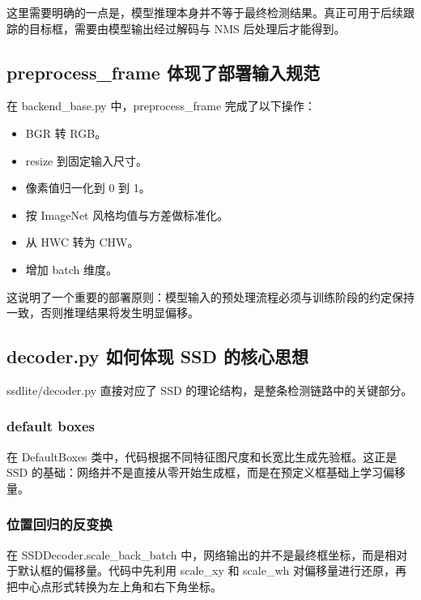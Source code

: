 这里需要明确的一点是，模型推理本身并不等于最终检测结果。真正可用于后续跟踪的目标框，需要由模型输出经过解码与
NMS 后处理后才能得到。

\subsection{preprocess\_frame
体现了部署输入规范}\label{src-experiment-case2-h27}

在 backend\_base.py 中，preprocess\_frame 完成了以下操作：

\begin{itemize}
\tightlist
\item
  BGR 转 RGB。
\item
  resize 到固定输入尺寸。
\item
  像素值归一化到 0 到 1。
\item
  按 ImageNet 风格均值与方差做标准化。
\item
  从 HWC 转为 CHW。
\item
  增加 batch 维度。
\end{itemize}

这说明了一个重要的部署原则：模型输入的预处理流程必须与训练阶段的约定保持一致，否则推理结果将发生明显偏移。

\subsection{decoder.py 如何体现 SSD
的核心思想}\label{src-experiment-case2-h28}

ssdlite/decoder.py 直接对应了 SSD
的理论结构，是整条检测链路中的关键部分。

\subsubsection{default boxes}\label{src-experiment-case2-h29}

在 DefaultBoxes 类中，代码根据不同特征图尺度和长宽比生成先验框。这正是
SSD
的基础：网络并不是直接从零开始生成框，而是在预定义框基础上学习偏移量。

\subsubsection{位置回归的反变换}\label{src-experiment-case2-h30}

在 SSDDecoder.scale\_back\_batch
中，网络输出的并不是最终框坐标，而是相对于默认框的偏移量。代码中先利用
scale\_xy 和 scale\_wh
对偏移量进行还原，再把中心点形式转换为左上角和右下角坐标。

